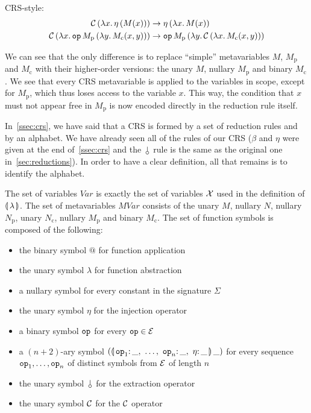 CRS-style:
\begin{align*}
  \mathcal{C}\,(\lambda x.\, \eta\,(M(x))) & \to \eta\,(\lambda x.\, M(x)) \\
  \mathcal{C}\,(\lambda x.\, \mathtt{op}\,M_{\mathrm{p}}\,(\lambda y.\, M_{\mathrm{c}}(x,y)))
  & \to \mathtt{op}\,M_{\mathrm{p}}\,(\lambda y.\, \mathcal{C}\,(\lambda x.\, M_{\mathrm{c}}(x,y)))
\end{align*}

We can see that the only difference is to replace ``simple'' metavariables
$M$, $M_{\mathrm{p}}$ and $M_{\mathrm{c}}$ with their higher-order
versions: the unary $M$, nullary $M_{\mathrm{p}}$ and binary
$M_{\mathrm{c}}$. We see that every CRS metavariable is applied to the
variables in scope, except for $M_{\mathrm{p}}$, which thus loses access to
the variable $x$. This way, the condition that $x$ must not appear free in
$M_{\mathrm{p}}$ is now encoded directly in the reduction rule itself.

In~\ref{ssec:crs}, we have said that a CRS is formed by a set of reduction
rules and by an alphabet. We have already seen all of the rules of our CRS
($\beta$ and $\eta$ were given at the end of~\ref{ssec:crs} and the
$\cherry$ rule is the same as the original one in~\ref{sec:reductions}). In
order to have a clear definition, all that remains is to identify the
alphabet.

The set of variables $Var$ is exactly the set of variables $\mathcal{X}$ used in
the definition of $\llparenthesis \, \lambda \, \rrparenthesis$. The set of metavariables $MVar$
consists of the unary $M$, nullary $N$, nullary $N_{\mathrm{p}}$, unary
$N_{\mathrm{c}}$, nullary $M_{\mathrm{p}}$ and binary $M_{\mathrm{c}}$. The
set of function symbols is composed of the following:

\begin{itemize}
\item the binary symbol $@$ for function application
\item the unary symbol $\lambda$ for function abstraction
\item a nullary symbol for every constant in the signature $\Sigma$
\item the unary symbol $\eta$ for the injection operator
\item a binary symbol $\mathtt{op}$ for every $\mathtt{op} \in \mathcal{E}$
\item a $(n+2)$-ary symbol
  $(\ap{\banana{\onto{\op{op}_1}{\_},\ \ldots,\ \onto{\op{op}_n}{\_},\ \onto{\eta}{\_}}}{\_})$
  for every sequence $\mathtt{op}_1,\ldots,\mathtt{op}_n$ of distinct symbols from
  $\mathcal{E}$ of length $n$
\item the unary symbol $\cherry$ for the extraction operator
\item the unary symbol $\mathcal{C}$ for the $\mathcal{C}$ operator
\end{itemize}

